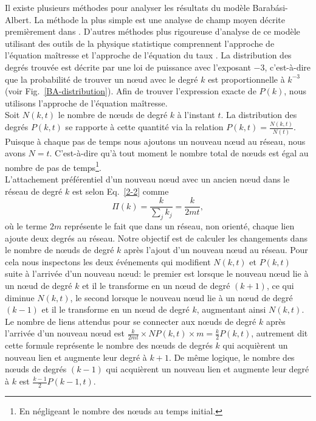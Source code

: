 Il existe plusieurs méthodes pour analyser les résultats du modèle Barabási-Albert.
La méthode la plus simple est une analyse de champ moyen décrite premièrement  dans \cite{BA1999}.
D'autres méthodes plus rigoureuse d'analyse de ce modèle utilisant des outils de la physique statistique comprennent l'approche de l'équation maîtresse \cite{Dorogovtsev-al2000-2} et l'approche de l'équation du taux \cite{Krapivsky-al2000}. La distribution des degrés trouvée est décrite par une loi de puissance avec l'exposant $-3$, c'est-à-dire que la probabilité de trouver un nœud avec le degré $k$ est proportionnelle à $k^{-3}$ (voir Fig.~\ref{BA-distribution}). Afin de trouver l'expression exacte de $P(k)$, nous utilisons l'approche de l'équation maîtresse.\\
Soit $N(k,t)$ le nombre de nœuds de degré $k$ à l'instant $t$. La distribution des degrés $P(k,t)$ se rapporte à cette quantité via la relation $P(k,t)=\frac{N(k,t)}{N(t)}$. Puisque à chaque pas de temps nous ajoutons un nouveau nœud au réseau, nous avons $N=t$. C'est-à-dire qu'à tout moment le nombre total de nœuds est égal au nombre de pas de temps\footnote{En négligeant le nombre des nœuds au temps initial.}.\\
L'attachement préférentiel d'un nouveau nœud avec un ancien nœud dans le réseau de degré $k$ est selon Eq.~\eqref{2-2}  comme
\begin{equation}
\Pi(k)=\frac{k}{\sum_{j}k_j}=\frac{k}{2mt},
\end{equation}
où le terme $2m$ représente le fait que dans un réseau, non orienté, chaque lien ajoute deux degrés au réseau. Notre objectif est de calculer les changements dans le nombre de nœuds de degré $k$ après l'ajout d'un nouveau nœud au réseau. Pour cela nous inspectons les deux événements qui modifient $N(k,t)$ et $P(k,t)$ suite à l'arrivée d'un nouveau nœud: le premier est lorsque le nouveau nœud lie à un nœud  de degré $k$ et il le transforme en un nœud de degré $(k+1)$, ce qui diminue $N(k,t)$, le second lorsque le nouveau nœud lie à un nœud de degré $(k-1)$ et il le transforme en un nœud de degré $k$, augmentant ainsi $N(k,t)$.\\
Le nombre de liens attendus pour se connecter aux nœuds de degré $k$ après l'arrivée d'un nouveau nœud est $\frac{k}{2mt}\times NP(k,t)\times m=\frac{k}{2}P(k,t)$, autrement dit cette formule représente le nombre des nœuds de degrés $k$ qui acquièrent un nouveau lien et augmente leur degré à $k+1$. De même logique, le nombre des nœuds de degrés $(k-1)$ qui acquièrent un nouveau lien et augmente leur degré à $k$ est $\frac{k-1}{2}P(k-1,t)$.
